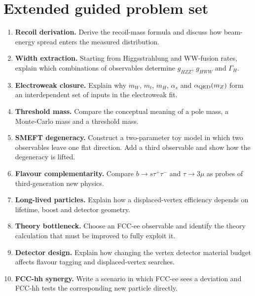 \documentclass[11pt,a4paper]{article}
\numberwithin{equation}{section}
\begin{document}
\section{Extended guided problem set}
\begin{enumerate}[leftmargin=1.6em]
\item \textbf{Recoil derivation.} Derive the recoil-mass formula and discuss how beam-energy spread enters the measured distribution.
\item \textbf{Width extraction.} Starting from Higgsstrahlung and WW-fusion rates, explain which combinations of observables determine \(g_{HZZ}\), \(g_{HWW}\) and \(\Gamma_H\).
\item \textbf{Electroweak closure.} Explain why \(m_W\), \(m_t\), \(m_H\), \(\alpha_s\) and \(\alpha_{\rm QED}(m_Z)\) form an interdependent set of inputs in the electroweak fit.
\item \textbf{Threshold mass.} Compare the conceptual meaning of a pole mass, a Monte-Carlo mass and a threshold mass.
\item \textbf{SMEFT degeneracy.} Construct a two-parameter toy model in which two observables leave one flat direction. Add a third observable and show how the degeneracy is lifted.
\item \textbf{Flavour complementarity.} Compare \(b\to s\tau^+\tau^-\) and \(\tau\to3\mu\) as probes of third-generation new physics.
\item \textbf{Long-lived particles.} Explain how a displaced-vertex efficiency depends on lifetime, boost and detector geometry.
\item \textbf{Theory bottleneck.} Choose an FCC-ee observable and identify the theory calculation that must be improved to fully exploit it.
\item \textbf{Detector design.} Explain how changing the vertex detector material budget affects flavour tagging and displaced-vertex searches.
\item \textbf{FCC-hh synergy.} Write a scenario in which FCC-ee sees a deviation and FCC-hh tests the corresponding new particle directly.
\end{enumerate}

\newpage
\end{document}
